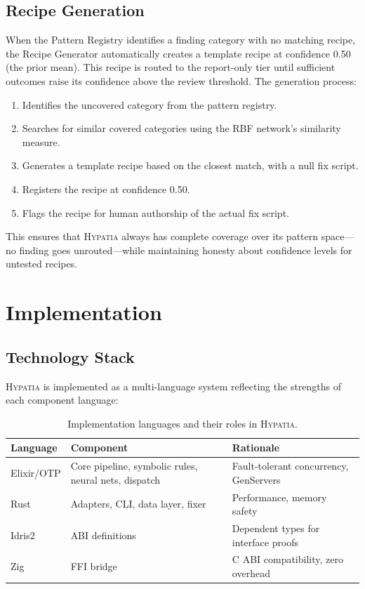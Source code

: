 \documentclass[11pt,a4paper]{article}
\begin{document}
\subsection{Recipe Generation}

When the Pattern Registry identifies a finding category with no matching recipe, the Recipe Generator automatically creates a template recipe at confidence 0.50 (the prior mean). This recipe is routed to the report-only tier until sufficient outcomes raise its confidence above the review threshold. The generation process:

\begin{enumerate}[nosep]
  \item Identifies the uncovered category from the pattern registry.
  \item Searches for similar covered categories using the RBF network's similarity measure.
  \item Generates a template recipe based on the closest match, with a null fix script.
  \item Registers the recipe at confidence 0.50.
  \item Flags the recipe for human authorship of the actual fix script.
\end{enumerate}

This ensures that \textsc{Hypatia} always has complete coverage over its pattern space---no finding goes unrouted---while maintaining honesty about confidence levels for untested recipes.


\section{Implementation}
\label{sec:implementation}

\subsection{Technology Stack}

\textsc{Hypatia} is implemented as a multi-language system reflecting the strengths of each component language:

\begin{table}[htbp]
\centering
\caption{Implementation languages and their roles in \textsc{Hypatia}.}
\label{tab:impl}
\begin{tabular}{@{}lll@{}}
\toprule
\textbf{Language} & \textbf{Component} & \textbf{Rationale} \\
\midrule
Elixir/OTP & Core pipeline, symbolic rules, neural nets, dispatch & Fault-tolerant concurrency, GenServers \\
Rust & Adapters, CLI, data layer, fixer & Performance, memory safety \\
Idris2 & ABI definitions & Dependent types for interface proofs \\
Zig & FFI bridge & C ABI compatibility, zero overhead \\
\bottomrule
\end{tabular}
\end{table}
\end{document}

